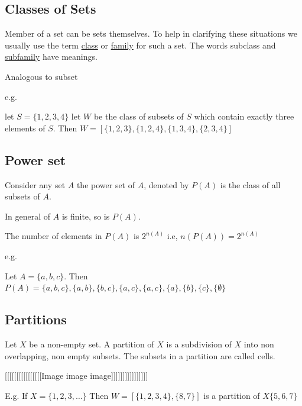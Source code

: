 \subsection{Classes of Sets}

Member of a set can be sets themselves. To help in clarifying these situations we usually use the term \underline{class} or \underline{family} for such a set. The words subclass and \underline{subfamily} have meanings.

Analogous to subset

e.g.

let $S = \{1,2,3,4\}$ let $W$ be the class of subsets of $S$ which contain exactly three elements of $S$. Then $W = [\{1,2,3\}, \{1,2,4\}, \{1,3,4\}, \{2,3,4\}]$


\subsection{Power set}

Consider any set $A$ the power set of $A$, denoted by $P(A)$ is the class of all subsets of $A$.

In general of $A$ is finite, so is $P(A)$.

The number of elements in $P(A)$ is $2^{n(A)}$ i.e, $n(P(A)) = 2^{n(A)}$


e.g.

Let $A = \{a,b,c\}$. Then $P(A) = \{a,b,c\}, \{a,b\} , \{b, c\}, \{a,c\}, \{a,c\}, \{a\}, \{b\}, \{c\}, \{\emptyset\}$

\subsection{Partitions}

Let $X$ be a non-empty set. A partition of $X$ is a subdivision of $X$ into non overlapping, non empty subsets. The subsets in a partition are called cells.

\begin{center}
    [[[[[[[[[[[[[[[[Image image image]]]]]]]]]]]]]]]]
\end{center}

E.g. If $X = \{1,2,3, \ldots\}$ Then $W = [\{1,2,3,4\}, \{8,7\}]$ is a partition of $X \{5,6,7\}$